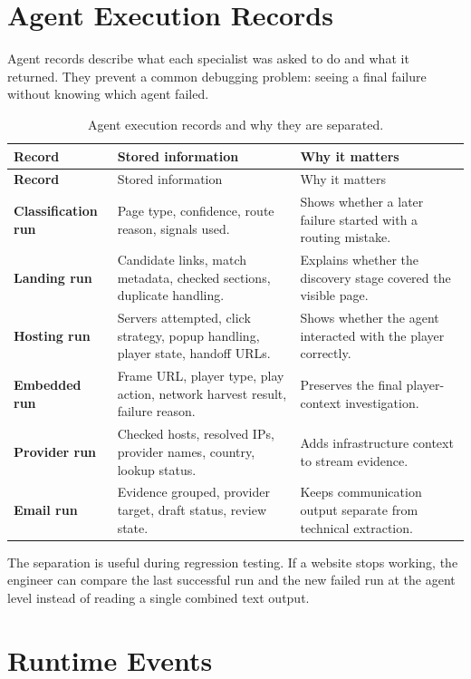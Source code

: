 \section{Agent Execution Records}

Agent records describe what each specialist was asked to do and what it
returned. They prevent a common debugging problem: seeing a final failure
without knowing which agent failed.

\begin{longtable}{>{\raggedright\arraybackslash\bfseries}p{3.7cm}
                  >{\raggedright\arraybackslash}p{4.3cm}
                  >{\raggedright\arraybackslash}p{5.7cm}}
\caption{Agent execution records and why they are separated.}
\label{tab:runtime-agent-records}\\
\toprule
\rowcolor{accent!8}
Record & Stored information & Why it matters \\
\midrule
\endfirsthead
\toprule
\rowcolor{accent!8}
Record & Stored information & Why it matters \\
\midrule
\endhead
\bottomrule
\endfoot
Classification run & Page type, confidence, route reason, signals used. &
Shows whether a later failure started with a routing mistake. \\
Landing run & Candidate links, match metadata, checked sections, duplicate
handling. & Explains whether the discovery stage covered the visible page. \\
Hosting run & Servers attempted, click strategy, popup handling, player state,
handoff URLs. & Shows whether the agent interacted with the player correctly. \\
Embedded run & Frame URL, player type, play action, network harvest result,
failure reason. & Preserves the final player-context investigation. \\
Provider run & Checked hosts, resolved IPs, provider names, country, lookup
status. & Adds infrastructure context to stream evidence. \\
Email run & Evidence grouped, provider target, draft status, review state. &
Keeps communication output separate from technical extraction. \\
\end{longtable}

The separation is useful during regression testing. If a website stops working,
the engineer can compare the last successful run and the new failed run at the
agent level instead of reading a single combined text output.

\section{Runtime Events}

